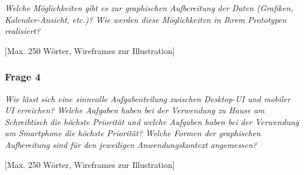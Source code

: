 \emph{Welche Möglichkeiten gibt es zur graphischen Aufbereitung der Daten (Grafiken, Kalender-Ansicht, etc.)? Wie werden diese Möglichkeiten in Ihrem Prototypen realisiert?}

\vspace{2mm}



[Max. 250 Wörter, Wireframes zur Illustration]



\subsubsection{Frage 4}

\emph{Wie lässt sich eine sinnvolle Aufgabenteilung zwischen Desktop-UI und mobiler UI erreichen? Welche Aufgaben haben bei der Verwendung zu Hause am Schreibtisch die höchste Priorität und welche Aufgaben haben bei der Verwendung am Smartphone die höchste Priorität? Welche Formen der graphischen Aufbereitung sind für den jeweiligen Anwendungskontext angemessen?}

\vspace{2mm}



[Max. 250 Wörter, Wireframes zur Illustration]
